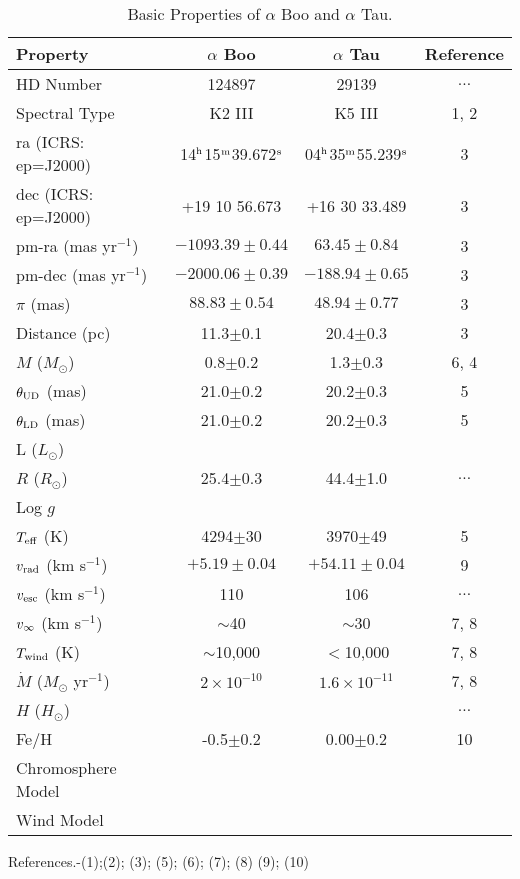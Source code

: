 \begin{table}[H]
\begin{center}
\caption[Basic Properties of $\alpha$ Boo and $\alpha$ Tau.]
{Basic Properties of $\alpha$ Boo and $\alpha$ Tau.}
\begin{tabular}{lccc}
\hline
\hline
\rule{0pt}{2.5ex}Property & $\alpha$ Boo & $\alpha$ Tau & Reference\\
\hline
\rule{0pt}{2.5ex}HD Number & 124897 & 29139 & $\ldots$\\
Spectral Type & K2 III & K5 III& 1, 2\\ 
ra (ICRS: ep=J2000)&14$^{\rm{h}}$15$^{\rm{m}}$39.672$^{\rm{s}}$&04$^{\rm{h}}$35$^{\rm{m}}$55.239$^{\rm{s}}$&3\\
dec (ICRS: ep=J2000) & +19 10 56.673 & +16 30 33.489 & 3 \\
pm-ra (mas yr$^{-1}$)& $-1093.39 \pm 0.44$ & $63.45\pm 0.84$  & 3 \\
pm-dec (mas yr$^{-1}$)& $-2000.06 \pm 0.39$ & $-188.94\pm 0.65$ & 3 \\
$\pi$ (mas)& $88.83\pm 0.54$ & $48.94\pm 0.77$& 3\\
Distance (pc)& 11.3$\pm$0.1 & 20.4$\pm$0.3& 3\\
$M$ ($M_{\odot}$) & 0.8$\pm$0.2 & 1.3$\pm$0.3& 6, 4 \\
$\theta _{\rm{UD}}$ (mas)& 21.0$\pm$0.2 & 20.2$\pm$0.3& 5 \\
$\theta _{\rm{LD}}$ (mas)& 21.0$\pm$0.2 & 20.2$\pm$0.3& 5 \\
L ($L_{\odot}$)& & & \\
$R$ ($R_{\odot}$)& 25.4$\pm$0.3 & 44.4$\pm$1.0 & $\ldots$ \\
Log $g$ & & & \\
$T_{\rm{eff}}$ (K) & 4294$\pm$30 & 3970$\pm$49& 5 \\
$v_{\rm{rad}}$ (km s$^{-1}$) & $+5.19 \pm 0.04$ & $+54.11\pm 0.04$ & 9\\
$v_{\rm{esc}}$ (km s$^{-1}$) &110 & 106& $\ldots$\\
$v_{\rm{\infty}}$ (km s$^{-1}$)& $\sim$40 & $\sim$30& 7, 8\\
$T_{\rm{wind}}$ (K)& $\sim$10,000 & $<$10,000 & 7, 8\\
$\dot{M}$ ($M_{\odot}$ yr$^{-1}$)& $2\times 10^{-10}$& $1.6\times 10^{-11}$& 7, 8\\
$H$ ($H_{\odot}$)& & & $\ldots$\\
Fe/H& -0.5$\pm$0.2 & 0.00$\pm$0.2 & 10\\
Chromosphere Model & \cite{drake_1985} & &\\
Wind Model & \cite{drake_1985}& & \\
\hline
\end{tabular}
\label{tab:1}
\begin{minipage}{13.0cm}
References.-(1);(2)\cite{gray_2006}; (3)\cite{van_leeuwen_2007}; (5)\cite{di_benedetto_1993};
(6)\cite{kallinger_2010}; (7)\cite{drake_1985}; (8)\cite{robinson_1998}
(9)\cite{massarotti_2008}; (10)\cite{decin_2003}
\end{minipage}
\end{center}
\end{table}

